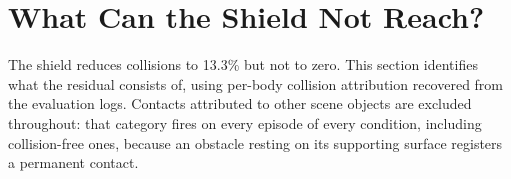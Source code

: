 %
%

\section{What Can the Shield Not Reach?}\label{sec:res:scope}

The shield reduces collisions to 13.3\% but not to zero. This section identifies what the residual
consists of, using per-body collision attribution recovered from the evaluation logs. Contacts
attributed to other scene objects are excluded throughout: that category fires on every episode of
every condition, including collision-free ones, because an obstacle resting on its supporting
surface registers a permanent contact.


